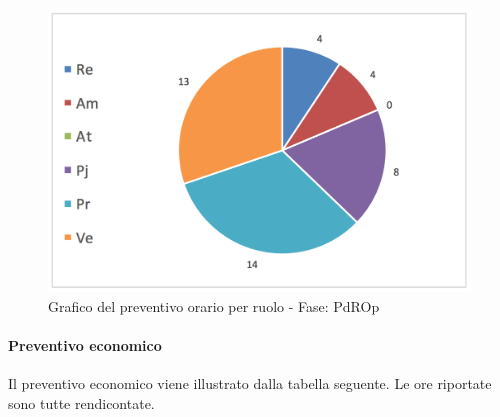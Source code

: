 			\begin{figure}[H]
			\centering
			\includegraphics[scale=0.32]{img/h_r_PdROp}
			\caption{Grafico del preventivo orario per ruolo - Fase: PdROp}
			\label{fig:h_r_PdROp"}
			\end{figure}

			\newpage
			\paragraph{Preventivo economico}
			Il preventivo economico viene illustrato dalla tabella seguente. Le ore riportate sono tutte rendicontate.\\

